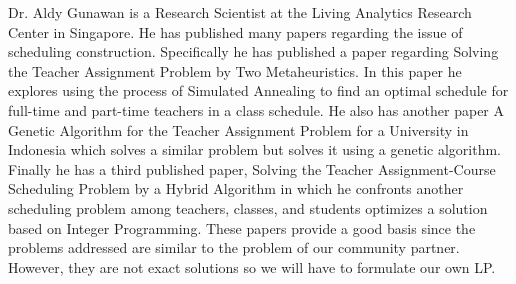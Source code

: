 \documentclass[11pt]{article}
\begin{document}
Dr. Aldy Gunawan is a Research Scientist at the Living Analytics Research Center in Singapore. He has published many papers regarding the issue of scheduling construction. Specifically he has published a paper regarding Solving the Teacher Assignment Problem by Two Metaheuristics. In this paper he explores using the process of Simulated Annealing to find an optimal schedule for full-time and part-time teachers in a class schedule. He also has another paper A Genetic Algorithm for the Teacher Assignment Problem for a University in Indonesia which solves a similar problem but solves it using a genetic algorithm. Finally he has a third published paper, Solving the Teacher Assignment-Course Scheduling Problem by a Hybrid Algorithm in which he confronts another scheduling problem among teachers, classes, and students optimizes a solution based on Integer Programming. These papers provide a good basis since the problems addressed are similar to the problem of our community partner. However, they are not exact solutions so we will have to formulate our own LP.
\end{document}
